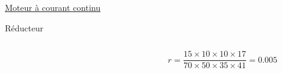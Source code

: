 \documentclass[french, handout]{beamer}
\begin{document}
\begin{frame}{\hyperlink{pres_moteur}{Moteur à courant continu}}
\begin{block}{Réducteur}
\begin{columns}[c]
                    \begin{column}{3.5 cm}
                        \vspace{-.75cm}
                        \begin{figure}[htbp]
                          \centering
                          
                        \end{figure}
                    \end{column}
                    \hspace{-0.7cm}
                    \begin{column}{6.5 cm}
                        \begin{tcolorbox}[colback=red!5!white, colframe=red!75!black, title=Equation : Rapport de réduction]
                            {\footnotesize \[r= \frac{15\times10\times10\times17}{70\times50\times35\times41} = 0.005\]}
                        \end{tcolorbox}
                    \end{column}
                \end{columns}
            \end{block}
        \end{frame}
        
\end{document}
